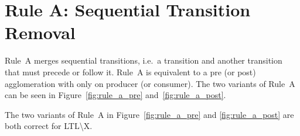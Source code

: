 \section*{Rule A: Sequential Transition Removal}\label{sec:rule_a}
Rule~A merges sequential transitions, i.e.\ a transition and another transition that must precede or follow it.
Rule~A is equivalent to a pre (or post) agglomeration with only on producer (or consumer).
The two variants of Rule~A can be seen in Figure~\ref{fig:rule_a_pre} and~\ref{fig:rule_a_post}.

\begin{theorem}\label{theorem:rule_a}
    The two variants of Rule~A in Figure~\ref{fig:rule_a_pre} and \ref{fig:rule_a_post} are both correct for LTL\textbackslash X.
\end{theorem}

